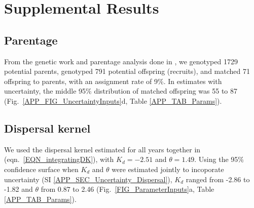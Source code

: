 \documentclass[12pt, oneside]{article}   	%
\begin{document}


\newpage{}

\section{Supplemental Results} \label{APP_SEC_RESULTS} %

\subsection{Parentage} \label{APP_SEC_RESULTS_Parentage}

From the genetic work and parentage analysis done in \cite{catalanoInPrepconnectivity}, we genotyped 1729 potential parents, genotyped 791 potential offspring (recruits), and matched 71 offspring to parents, with an assignment rate of 9\%. In estimates with uncertainty, the middle 95\% distribution of matched offspring was 55 to 87 (Fig.\ \ref{APP_FIG_UncertaintyInputs}d, Table \ref{APP_TAB_Params}).

\subsection{Dispersal kernel} \label{APP_SEC_RESULTS_Dispersal}

We used the dispersal kernel estimated for all years together in \cite{catalanoInPrepconnectivity} (eqn.\ \ref{EQN_integratingDK}), with $K_d = -2.51$ and $\theta = 1.49$. Using the 95\% confidence surface when $K_d$ and $\theta$ were estimated jointly to incoporate uncertainty (SI \ref{APP_SEC_Uncertainty_Dispersal}), $K_d$ ranged from -2.86 to -1.82 and $\theta$ from 0.87 to 2.46 (Fig.\ \ref{FIG_ParameterInputs}a, Table \ref{APP_TAB_Params}).
\end{document}
